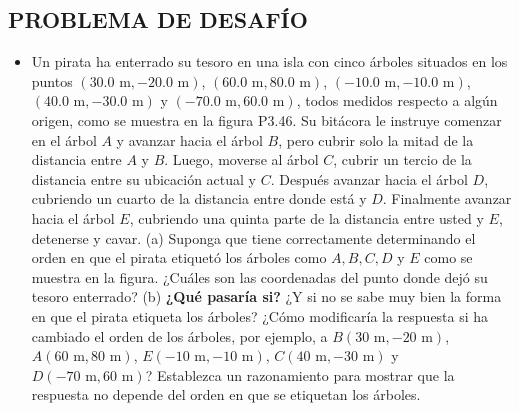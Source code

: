 \documentclass[11pt,a4paper]{article}
\begin{document}
\newpage

\subsection*{PROBLEMA DE DESAFÍO}

\begin{itemize}
    \item[\textbf{46.}] Un pirata ha enterrado su tesoro en una isla con cinco árboles situados en los puntos $(30.0 \text{ m}, -20.0 \text{ m})$, $(60.0 \text{ m}, 80.0 \text{ m})$, $(-10.0 \text{ m}, -10.0 \text{ m})$, $(40.0 \text{ m}, -30.0 \text{ m})$ y $(-70.0 \text{ m}, 60.0 \text{ m})$, todos medidos respecto a algún origen, como se muestra en la figura P3.46. Su bitácora le instruye comenzar en el árbol $A$ y avanzar hacia el árbol $B$, pero cubrir solo la mitad de la distancia entre $A$ y $B$. Luego, moverse al árbol $C$, cubrir un tercio de la distancia entre su ubicación actual y $C$. Después avanzar hacia el árbol $D$, cubriendo un cuarto de la distancia entre donde está y $D$. Finalmente avanzar hacia el árbol $E$, cubriendo una quinta parte de la distancia entre usted y $E$, detenerse y cavar. (a) Suponga que tiene correctamente determinando el orden en que el pirata etiquetó los árboles como $A, B, C, D$ y $E$ como se muestra en la figura. ¿Cuáles son las coordenadas del punto donde dejó su tesoro enterrado? (b) \textbf{¿Qué pasaría si?} ¿Y si no se sabe muy bien la forma en que el pirata etiqueta los árboles? ¿Cómo modificaría la respuesta si ha cambiado el orden de los árboles, por ejemplo, a $B(30 \text{ m}, -20 \text{ m})$, $A(60 \text{ m}, 80 \text{ m})$, $E(-10 \text{ m}, -10 \text{ m})$, $C(40 \text{ m}, -30 \text{ m})$ y $D(-70 \text{ m}, 60 \text{ m})$? Establezca un razonamiento para mostrar que la respuesta no depende del orden en que se etiquetan los árboles.
    \vspace*{9cm}
\end{itemize}
\end{document}
